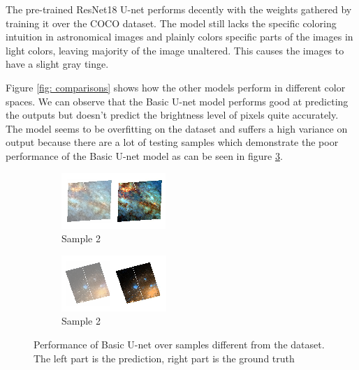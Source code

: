 \documentclass{article} %
\begin{document}
    The pre-trained ResNet18 U-net performs decently with the weights gathered by training it over the COCO dataset. The model still lacks the specific coloring intuition in astronomical images and plainly colors specific parts of the images in light colors, leaving majority of the image unaltered. This causes the images to have a slight gray tinge.
    
    Figure \ref{fig: comparisons} shows how the other models perform in different color spaces. We can observe that the Basic U-net model performs good at predicting the outputs but doesn't predict the brightness level of pixels quite accurately. The model seems to be overfitting on the dataset and suffers a high variance on output because there are a lot of testing samples which demonstrate the poor performance of the Basic U-net model as can be seen in figure \ref{fig: u-net_overfit}.
    \begin{figure}[!htb]
    	\centering
    	\begin{subfigure}[b]{0.3\textwidth}
    		\centering
    		\includegraphics[width=\textwidth]{figures/overfit_1}
    		\caption{Sample 2}
    		\label{fig: overfit1}
    	\end{subfigure}
    		\hspace{0.1 in}
    	\begin{subfigure}[b]{0.3\textwidth}
    		\centering
    		\includegraphics[width=\textwidth]{figures/overfit_2}
    		\caption{Sample 2}
    		\label{fig: overfit2}
    	\end{subfigure}
    	\caption{Performance of Basic U-net over samples different from the dataset. The left part is the prediction, right part is the ground truth}
    	\label{fig: u-net_overfit}
    \end{figure}
    
\end{document}
